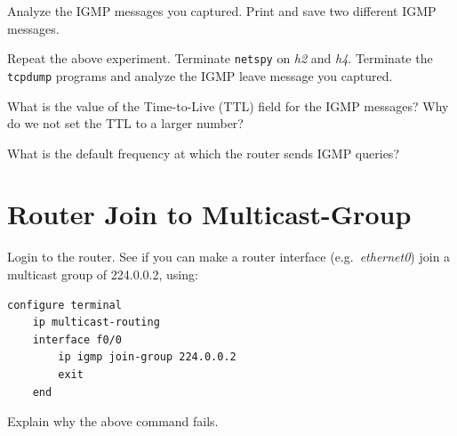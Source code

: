 \documentclass{../UTNetLab}
\begin{document}
    Analyze the IGMP messages you captured.
    Print and save two different IGMP messages.

    Repeat the above experiment.
    Terminate \lstinline{netspy} on \textit{h2} and \textit{h4}.
    Terminate the \lstinline{tcpdump} programs and analyze the IGMP leave message you captured.
    
    \begin{report}
    \item What is the value of the Time-to-Live (TTL) field for the IGMP messages?
    Why do we not set the TTL to a larger number?

    \item What is the default frequency at which the router sends IGMP queries?
    \end{report}

\section{Router Join to Multicast-Group}
    Login to the router.
    See if you can make a router interface (e.g.\ \textit{ethernet0}) join a multicast group of 224.0.0.2, using:
    \begin{lstlisting}[language={cisco}]
configure terminal
    ip multicast-routing
    interface f0/0
        ip igmp join-group 224.0.0.2
        exit
    end
    \end{lstlisting}
    
    \begin{report}
    \item Explain why the above command fails.
    \end{report}
\end{document}
